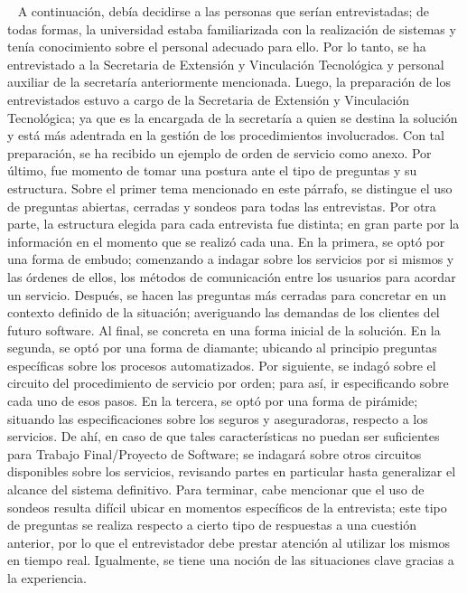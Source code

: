 \ \newline
\normalsize{ \indent
A continuaci\'on, deb\'ia decidirse a las personas que ser\'ian
entrevistadas; de todas formas, la universidad estaba
familiarizada con la realizaci\'on de sistemas y ten\'ia
conocimiento sobre el personal adecuado para ello. Por lo tanto,
se ha entrevistado a la Secretaria de Extensi\'on y Vinculaci\'on
Tecnol\'ogica y personal auxiliar de la secretar\'ia anteriormente
mencionada.
}
\newline
\normalsize{ \indent
Luego, la preparaci\'on de los entrevistados estuvo a cargo de
la Secretaria de Extensi\'on y Vinculaci\'on Tecnol\'ogica; ya
que es la encargada de la secretar\'ia a quien se destina la
soluci\'on y est\'a m\'as adentrada en la gesti\'on de los
procedimientos involucrados. Con tal preparaci\'on, se ha
recibido un ejemplo de orden de servicio como anexo.
}
\newline
\normalsize{ \indent
Por \'ultimo, fue momento de tomar una postura ante el tipo de
preguntas y su estructura. Sobre el primer tema mencionado en
este p\'arrafo, se distingue el uso de preguntas abiertas,
cerradas y sondeos para todas las entrevistas. Por otra parte,
la estructura elegida para cada entrevista fue distinta; en
gran parte por la informaci\'on en el momento que se realiz\'o
cada una.
}
\newline
\normalsize{ \indent
En la primera, se opt\'o por una forma de embudo; comenzando
a indagar sobre los servicios por si mismos y las \'ordenes
de ellos, los m\'etodos de comunicaci\'on entre los usuarios
para acordar un servicio. Después, se hacen las preguntas
m\'as cerradas para concretar en un contexto definido de la
situaci\'on; averiguando las demandas de los clientes del
futuro software. Al final, se concreta en una forma inicial
de la soluci\'on.
}
\newline
\normalsize{ \indent
En la segunda, se opt\'o por una forma de diamante; ubicando
al principio preguntas espec\'ificas sobre los procesos
automatizados. Por siguiente, se indag\'o sobre el circuito
del procedimiento de servicio por orden; para as\'i, ir
especificando sobre cada uno de esos pasos.
}
\newline
\normalsize{ \indent
En la tercera, se opt\'o por una forma de pir\'amide;
situando las especificaciones sobre los seguros y
aseguradoras, respecto a los servicios. De ah\'i, en
caso de que tales caracter\'isticas no puedan ser
suficientes para Trabajo Final/Proyecto de Software;
se indagar\'a sobre otros circuitos disponibles sobre
los servicios, revisando partes en particular hasta
generalizar el alcance del sistema definitivo.
}
\newline
\normalsize { \indent
Para terminar, cabe mencionar que el uso de sondeos resulta
dif\'icil ubicar en momentos espec\'ificos de la entrevista;
este tipo de preguntas se realiza respecto a cierto tipo de
respuestas a una cuesti\'on anterior, por lo que el
entrevistador debe prestar atenci\'on al utilizar los mismos
en tiempo real. Igualmente, se tiene una noci\'on de las
situaciones clave gracias a la experiencia.
}
\clearpage
